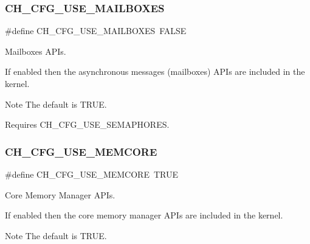 \subsubsection{\texorpdfstring{C\+H\+\_\+\+C\+F\+G\+\_\+\+U\+S\+E\+\_\+\+M\+A\+I\+L\+B\+O\+X\+ES}{CH\_CFG\_USE\_MAILBOXES}}
{\footnotesize\ttfamily \#define C\+H\+\_\+\+C\+F\+G\+\_\+\+U\+S\+E\+\_\+\+M\+A\+I\+L\+B\+O\+X\+ES~F\+A\+L\+SE}



Mailboxes A\+P\+Is. 

If enabled then the asynchronous messages (mailboxes) A\+P\+Is are included in the kernel.

\begin{DoxyNote}{Note}
The default is {\ttfamily T\+R\+UE}. 

Requires {\ttfamily C\+H\+\_\+\+C\+F\+G\+\_\+\+U\+S\+E\+\_\+\+S\+E\+M\+A\+P\+H\+O\+R\+ES}. 
\end{DoxyNote}
\hypertarget{group__config_gaad95228d05e4107b33836d30d21645a7}{}\label{group__config_gaad95228d05e4107b33836d30d21645a7} 
\subsubsection{\texorpdfstring{C\+H\+\_\+\+C\+F\+G\+\_\+\+U\+S\+E\+\_\+\+M\+E\+M\+C\+O\+RE}{CH\_CFG\_USE\_MEMCORE}}
{\footnotesize\ttfamily \#define C\+H\+\_\+\+C\+F\+G\+\_\+\+U\+S\+E\+\_\+\+M\+E\+M\+C\+O\+RE~T\+R\+UE}



Core Memory Manager A\+P\+Is. 

If enabled then the core memory manager A\+P\+Is are included in the kernel.

\begin{DoxyNote}{Note}
The default is {\ttfamily T\+R\+UE}. 
\end{DoxyNote}
\hypertarget{group__config_ga826c1fac997fb6e976c3012d20316444}{}\label{group__config_ga826c1fac997fb6e976c3012d20316444} 
